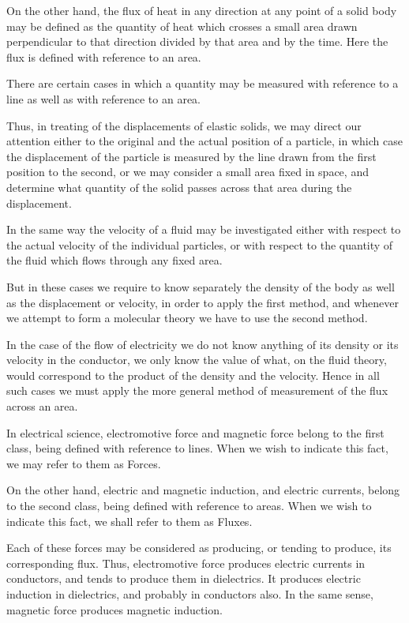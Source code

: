 \documentclass[11pt,a4paper]{article}
\begin{document}
On the other hand, the flux of heat in any direction at any point of a
solid body may be defined as the quantity of heat which crosses a small
area drawn perpendicular to that direction divided by that area and by
the time. Here the flux is defined with reference to an area.

\clearpage

There are certain cases in which a quantity may be measured with
reference to a line as well as with reference to an area.

Thus, in treating of the displacements of elastic solids, we may direct
our attention either to the original and the actual position of a
particle, in which case the displacement of the particle is measured by
the line drawn from the first position to the second, or we may consider
a small area fixed in space, and determine what quantity of the solid
passes across that area during the displacement.

In the same way the velocity of a fluid may be investigated either with
respect to the actual velocity of the individual particles, or with
respect to the quantity of the fluid which flows through any fixed area.

But in these cases we require to know separately the density of the body
as well as the displacement or velocity, in order to apply the first
method, and whenever we attempt to form a molecular theory we have to
use the second method.

In the case of the flow of electricity we do not know anything of its
density or its velocity in the conductor, we only know the value of
what, on the fluid theory, would correspond to the product of the
density and the velocity. Hence in all such cases we must apply the more
general method of measurement of the flux across an area.

In electrical science, electromotive force and magnetic force belong to
the first class, being defined with reference to lines. When we wish to
indicate this fact, we may refer to them as Forces.

On the other hand, electric and magnetic induction, and electric
currents, belong to the second class, being defined with reference to
areas. When we wish to indicate this fact, we shall refer to them as
Fluxes.

Each of these forces may be considered as producing, or tending to
produce, its corresponding flux. Thus, electromotive force produces
electric currents in conductors, and tends to produce them in
dielectrics. It produces electric induction in dielectrics, and probably
in conductors also. In the same sense, magnetic force produces magnetic
induction.
\end{document}
